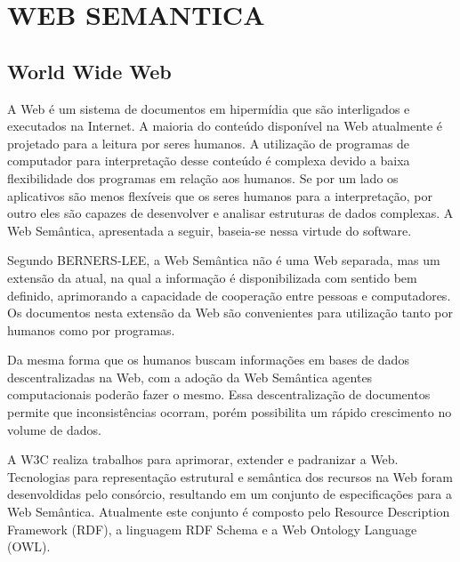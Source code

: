 \chapter{WEB SEMANTICA} %
\label{cha:web_semantica}

\section{World Wide Web} %
\label{sec:world_wide_web}


A Web é um sistema de documentos em hipermídia que são interligados e executados na Internet. A maioria do conteúdo disponível na Web atualmente é projetado para a leitura por seres humanos. A utilização de programas de computador para interpretação desse conteúdo é complexa devido a baixa flexibilidade dos programas em relação aos humanos. Se por um lado os aplicativos são menos flexíveis que os seres humanos para a interpretação, por outro eles são capazes de desenvolver e analisar estruturas de dados complexas. A Web Semântica, apresentada a seguir, baseia-se nessa virtude do software. 


Segundo BERNERS-LEE, a Web Semântica não é uma Web separada, mas um extensão da atual, na qual a informação é disponibilizada com sentido bem definido, aprimorando a capacidade de cooperação entre pessoas e computadores\cite{the_semantic_web}. Os documentos nesta extensão da Web são convenientes para utilização tanto por humanos como por programas.


Da mesma forma que os humanos buscam informações em bases de dados descentralizadas na Web, com a adoção da Web Semântica agentes computacionais poderão fazer o mesmo. Essa descentralização de documentos permite que inconsistências ocorram, porém possibilita um rápido crescimento no volume de dados.


A W3C realiza trabalhos para aprimorar, extender e padranizar a Web. Tecnologias para representação estrutural e semântica dos recursos na Web foram desenvoldidas pelo consórcio, resultando em um conjunto de especificações para a Web Semântica. Atualmente este conjunto é composto pelo Resource Description Framework (RDF), a linguagem RDF Schema e a Web Ontology Language (OWL).


